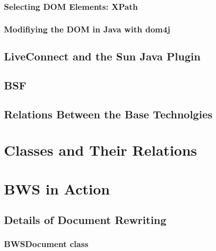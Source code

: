     
    
   \subsubsection{Selecting DOM Elements: XPath}
    \label{sec:SelectingDOMElementsXPath}
    
   
   \subsubsection{Modifiying the DOM in Java with dom4j}
   
    
    
  \subsection{LiveConnect and the Sun Java Plugin}
   \label{sec:liveconnect}  
   
   
  \subsection{BSF}
  
   
  
  \subsection{Relations Between the Base Technolgies}
   
   
   
 \section{Classes and Their Relations}
 
  
   
 \section{BWS in Action}
  
  
  
  \subsection{Details of Document Rewriting}
  
   

   \subsubsection{BWSDocument class}
   \label{sec:docRewritting}
     
